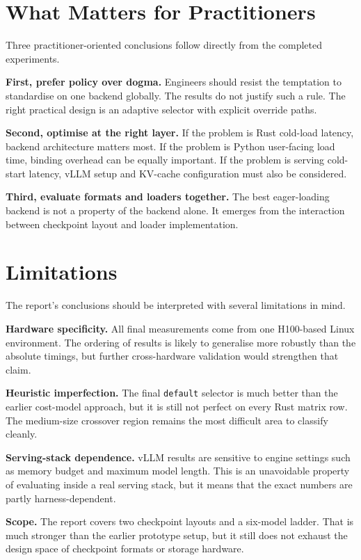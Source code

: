 \section{What Matters for Practitioners}

Three practitioner-oriented conclusions follow directly from the completed experiments.

\textbf{First, prefer policy over dogma.} Engineers should resist the temptation to standardise on one backend globally. The results do not justify such a rule. The right practical design is an adaptive selector with explicit override paths.

\textbf{Second, optimise at the right layer.} If the problem is Rust cold-load latency, backend architecture matters most. If the problem is Python user-facing load time, binding overhead can be equally important. If the problem is serving cold-start latency, vLLM setup and KV-cache configuration must also be considered.

\textbf{Third, evaluate formats and loaders together.} The best eager-loading backend is not a property of the backend alone. It emerges from the interaction between checkpoint layout and loader implementation.

\section{Limitations}

The report's conclusions should be interpreted with several limitations in mind.

\textbf{Hardware specificity.} All final measurements come from one H100-based Linux environment. The ordering of results is likely to generalise more robustly than the absolute timings, but further cross-hardware validation would strengthen that claim.

\textbf{Heuristic imperfection.} The final \texttt{default} selector is much better than the earlier cost-model approach, but it is still not perfect on every Rust matrix row. The medium-size crossover region remains the most difficult area to classify cleanly.

\textbf{Serving-stack dependence.} vLLM results are sensitive to engine settings such as memory budget and maximum model length. This is an unavoidable property of evaluating inside a real serving stack, but it means that the exact numbers are partly harness-dependent.

\textbf{Scope.} The report covers two checkpoint layouts and a six-model ladder. That is much stronger than the earlier prototype setup, but it still does not exhaust the design space of checkpoint formats or storage hardware.

